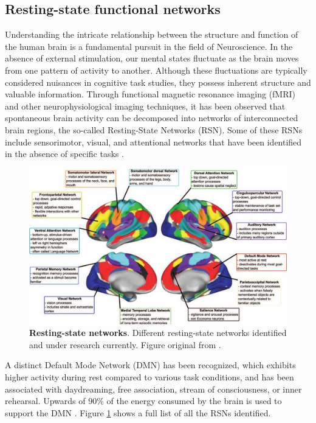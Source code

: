 \documentclass[../main.tex]{subfiles}
\begin{document}
\subsection{Resting-state functional networks}
Understanding the intricate relationship between the structure and function of the human brain is a fundamental pursuit in the field of Neuroscience.
In the absence of external stimulation, our mental states fluctuate as the brain moves from one pattern of activity to another.
Although these fluctuations are typically considered nuisances in cognitive task studies, they possess inherent structure and valuable information.
Through functional magnetic resonance imaging (fMRI) and other neurophysiological imaging techniques, it has been observed that spontaneous brain activity can be decomposed into networks of interconnected brain regions, the so-called Resting-State Networks (RSN).
Some of these RSNs include sensorimotor, visual, and attentional networks that have been identified in the absence of specific tasks \citep{seitzman_state_2019}.
\begin{figure}[!htb]
    \centering
    \includegraphics[width=\textwidth]{chapter3/figures/RSN_.jpeg}
    \caption{\textbf{Resting-state networks}.
    Different resting-state networks identified and under research currently. 
    Figure original from \citep{seitzman_state_2019}.}
    \label{fig:RSNs}
\end{figure}
A distinct Default Mode Network (DMN) has been recognized, which exhibits higher activity during rest compared to various task conditions, and has been associated with daydreaming, free association, stream of consciousness, or inner rehearsal. Upwards of 90\% of the energy consumed by the brain is used to support the DMN \citep{raichle2007default,deco_key_2009}.
Figure \ref{fig:RSNs} shows a full list of all the RSNs identified.
\end{document}
